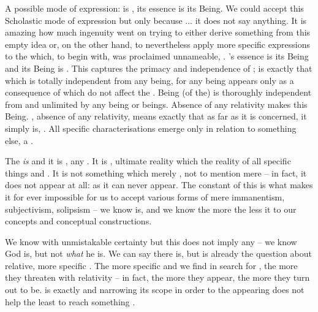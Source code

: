 A possible mode of expression:   is ,
its essence is its Being. %
We could accept this Scholastic mode of expression but only because ... it does
not say anything. It is amazing how much ingenuity went on trying to either
derive something from this empty idea or, on the other hand, to
nevertheless apply more specific expressions to the  which, to begin
with, was proclaimed unnameable, .  's essence
is its Being and its Being is . This  captures
the primacy and independence of ; 
 is exactly that which is totally independent from any being,
for any being appears only as a consequence of  which do not
affect the .  Being (of the)  is thoroughly
independent from and unlimited by any being or beings. Absence of any relativity
makes this  Being. , absence of any relativity,
means exactly that as far as it is 
concerned, it simply is, . All specific
characterisations emerge only 
in relation to something else, a . 


\pa\label{nothingtoknow}
The  {\em is} and it is  
,  any . It is , ultimate
reality which  the reality of all specific things and
.  It is not something which merely , not to
mention mere  -- in fact, it does not appear at all: as
 it can never appear. 
The constant  of this
 is what makes it for ever impossible for us to accept various
forms of mere immanentism, subjectivism, solipsism -- we know  is, and
we know  the more the less it  to our concepts and conceptual
constructions.

We know  with unmistakable certainty but
this does not imply any  -- we know  God is, but
not {\em what} he is. We can say  there is, but  is
already the question about relative, more specific .  The more
specific and   we find in search for ,
the more they threaten with relativity -- in fact, the more  they
appear, the more  they turn out to be.   is
exactly  and narrowing its scope in order to  the
appearing  does not help the least to reach something .

